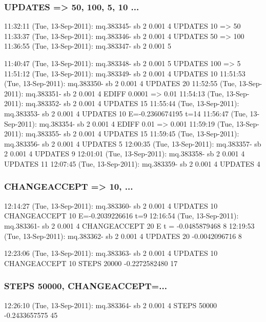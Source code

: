 \subsubsection{UPDATES => 50, 100, 5, 10 ...}

11:32:11 (Tue, 13-Sep-2011):
	mq.383345- sb 2 0.001 4
							UPDATES 10 => 50
11:33:37 (Tue, 13-Sep-2011):
	mq.383346- sb 2 0.001 4
							UPDATES 50 => 100
11:36:55 (Tue, 13-Sep-2011):
	mq.383347- sb 2 0.001 5

11:40:47 (Tue, 13-Sep-2011):
	mq.383348- sb 2 0.001 5
							UPDATES 100 => 5
11:51:12 (Tue, 13-Sep-2011):
	mq.383349- sb 2 0.001 4
							UPDATES 10
11:51:53 (Tue, 13-Sep-2011):
	mq.383350- sb 2 0.001 4
							UPDATES 20
11:52:55 (Tue, 13-Sep-2011):
	mq.383351- sb 2 0.001 4
							EDIFF 0.0001 => 0.01
11:54:13 (Tue, 13-Sep-2011):
	mq.383352- sb 2 0.001 4
							UPDATES 15
11:55:44 (Tue, 13-Sep-2011):
	mq.383353- sb 2 0.001 4
							UPDATES 10
										E=-0.2360674195 
										t=14
11:56:47 (Tue, 13-Sep-2011):
	mq.383354- sb 2 0.001 4
							EDIFF 0.01 => 0.001
11:59:19 (Tue, 13-Sep-2011):
	mq.383355- sb 2 0.001 4
							UPDATES 15
11:59:45 (Tue, 13-Sep-2011):
	mq.383356- sb 2 0.001 4
							UPDATES 5
12:00:35 (Tue, 13-Sep-2011):
	mq.383357- sb 2 0.001 4
							UPDATES 9
12:01:01 (Tue, 13-Sep-2011):
	mq.383358- sb 2 0.001 4
							UPDATES 11
12:07:45 (Tue, 13-Sep-2011):
	mq.383359- sb 2 0.001 4
							UPDATES 4

\subsubsection{CHANGEACCEPT => 10, ...}

12:14:27 (Tue, 13-Sep-2011):
	mq.383360- sb 2 0.001 4
							UPDATES 10
							CHANGEACCEPT 10
								E=-0.2039226616 
								t=9
12:16:54 (Tue, 13-Sep-2011):
	mq.383361- sb 2 0.001 4
							CHANGEACCEPT 20
								E t = -0.0485879468 8 
12:19:53 (Tue, 13-Sep-2011):
	mq.383362- sb 2 0.001 4
							UPDATES 20
									-0.0042096716 8 

12:23:06 (Tue, 13-Sep-2011):
	mq.383363- sb 2 0.001 4
							UPDATES 10
							CHANGEACCEPT 10
							STEPS 20000
-0.2272582480 17 

\subsubsection{STEPS 50000, CHANGEACCEPT=...}

							
12:26:10 (Tue, 13-Sep-2011):
	mq.383364- sb 2 0.001 4
							STEPS 50000
-0.2433657575 45 

